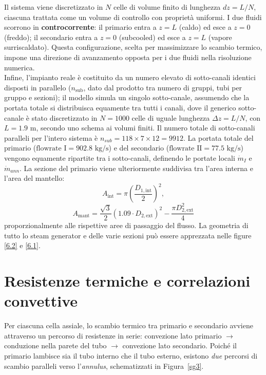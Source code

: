 \documentclass[12pt]{report}
\begin{document}
Il sistema viene discretizzato in $N$ celle di volume finito di lunghezza $dz = L/N$, ciascuna trattata come un volume di controllo con proprietà uniformi. I due fluidi scorrono in \textbf{controcorrente}: il primario entra a $z=L$ (caldo) ed esce a $z=0$ (freddo); il secondario entra a $z=0$ (subcooled) ed esce a $z=L$ (vapore surriscaldato). Questa configurazione, scelta per massimizzare lo scambio termico, impone una direzione di avanzamento opposta per i due fluidi nella risoluzione numerica.\\
Infine, l'impianto reale è costituito da un numero elevato di sotto-canali identici disposti in parallelo ($n_{\text{sub}}$, dato dal prodotto tra numero di gruppi, tubi per gruppo e sezioni); il modello simula un singolo sotto-canale, assumendo che la portata totale si distribuisca equamente tra tutti i canali, dove il generico sotto-canale è stato discretizzato in $N = 1000$ celle di uguale lunghezza $\Delta z = L/N$, con $L = 1.9\text{ m}$, secondo uno schema ai volumi finiti. Il numero totale di sotto-canali paralleli per l'intero sistema è $n_{sub} = 118 \times 7 \times 12 = 9912$. La portata totale del primario ($\text{flowrate I} = 902.8\text{ kg/s}$) e del secondario ($\text{flowrate II} = 77.5\text{ kg/s}$) vengono equamente ripartite tra i sotto-canali, definendo le portate locali $\dot{m}_I$ e $\dot{m}_{ann}$. La sezione del primario viene ulteriormente suddivisa tra l'area interna e l'area del mantello:  
\begin{equation}
    A_{\text{int}} = \pi \left( \frac{D_{1,\text{int}}}{2} \right)^2,
\end{equation}
\begin{equation}
    A_{\text{mant}} = \frac{\sqrt{3}}{2} \left( 1.09 \cdot D_{2,\text{ext}} \right)^2 - \frac{\pi D_{2,\text{ext}}^2}{4}
\end{equation}
proporzionalmente alle rispettive aree di passaggio del flusso. La geometria di tutto lo steam generator e delle varie sezioni può essere apprezzata nelle figure \ref {6.2} e \ref {6.1}.


\section{Resistenze termiche e correlazioni convettive}
\label{sec:resistenze}

Per ciascuna cella assiale, lo scambio termico tra primario e secondario avviene attraverso un percorso di resistenze in serie: convezione lato primario $\rightarrow$ conduzione nella parete del tubo $\rightarrow$ convezione lato secondario. Poiché il primario lambisce sia il tubo interno che il tubo esterno, esistono \emph{due} percorsi di scambio paralleli verso l'\textit{annulus}, schematizzati in Figura~\ref{sg3}.
\end{document}
